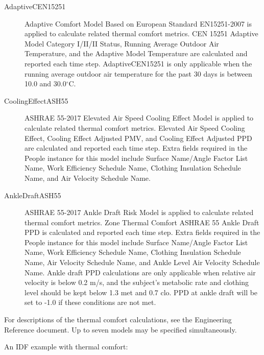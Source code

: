 \begin{description}
  \item[AdaptiveCEN15251]
  Adaptive Comfort Model Based on European Standard EN15251-2007 is applied to calculate related thermal comfort metrics. CEN 15251 Adaptive Model Category I/II/II Status, Running Average Outdoor Air Temperature, and the Adaptive Model Temperature are calculated and reported each time step. AdaptiveCEN15251 is only applicable when the running average outdoor air temperature for the past 30 days is between 10.0 and 30.0$^\circ$C.

  \item[CoolingEffectASH55]
  ASHRAE 55-2017 Elevated Air Speed Cooling Effect Model is applied to calculate related thermal comfort metrics. Elevated Air Speed Cooling Effect, Cooling Effect Adjusted PMV, and Cooling Effect Adjusted PPD are calculated and reported each time step. Extra fields required in the People instance for this model include Surface Name/Angle Factor List Name, Work Efficiency Schedule Name, Clothing Insulation Schedule Name, and Air Velocity Schedule Name.

  \item[AnkleDraftASH55]
  ASHRAE 55-2017 Ankle Draft Risk Model is applied to calculate related thermal comfort metrics. Zone Thermal Comfort ASHRAE 55 Ankle Draft PPD is calculated and reported each time step. Extra fields required in the People instance for this model include Surface Name/Angle Factor List Name, Work Efficiency Schedule Name, Clothing Insulation Schedule Name, Air Velocity Schedule Name, and Ankle Level Air Velocity Schedule Name. Ankle draft PPD calculations are only applicable when relative air velocity is below 0.2 m/s, and the subject’s metabolic rate and clothing level should be kept below 1.3 met and 0.7 clo. PPD at ankle draft will be set to -1.0 if these conditions are not met.

\end{description}

For descriptions of the thermal comfort calculations, see the Engineering Reference document. Up to seven models may be specified simultaneously.

An IDF example with thermal comfort:

